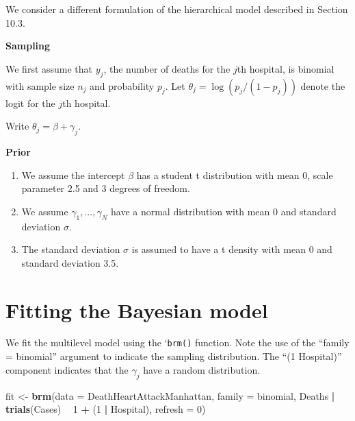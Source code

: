 \documentclass[
]{book}
\newenvironment{Shaded}{\begin{snugshade}}{\end{snugshade}}
\newcommand{\DataTypeTok}[1]{\textcolor[rgb]{0.13,0.29,0.53}{#1}}
\newcommand{\DecValTok}[1]{\textcolor[rgb]{0.00,0.00,0.81}{#1}}
\newcommand{\KeywordTok}[1]{\textcolor[rgb]{0.13,0.29,0.53}{\textbf{#1}}}
\newcommand{\NormalTok}[1]{#1}
\newcommand{\OperatorTok}[1]{\textcolor[rgb]{0.81,0.36,0.00}{\textbf{#1}}}
\newcommand{\StringTok}[1]{\textcolor[rgb]{0.31,0.60,0.02}{#1}}
\begin{document}
We consider a different formulation of the hierarchical model described in Section 10.3.

\textbf{Sampling}

We first assume that \(y_j\), the number of deaths for the \(j\)th hospital, is binomial with sample size \(n_j\) and probability \(p_j\). Let \(\theta_j = \log (p_j / (1 - p_j))\) denote the logit for the \(j\)th hospital.

Write \(\theta_j = \beta + \gamma_j\).

\textbf{Prior}

\begin{enumerate}
\def\labelenumi{\arabic{enumi}.}
\item
  We assume the intercept \(\beta\) has a student t distribution with mean 0, scale parameter 2.5 and 3 degrees of freedom.
\item
  We assume \(\gamma_1, ..., \gamma_N\) have a normal distribution with mean 0 and standard deviation \(\sigma\).
\item
  The standard deviation \(\sigma\) is assumed to have a t density with mean 0 and standard deviation 3.5.
\end{enumerate}

\hypertarget{fitting-the-bayesian-model}{%
\section{Fitting the Bayesian model}\label{fitting-the-bayesian-model}}

We fit the multilevel model using the `\texttt{brm()} function. Note the use of the ``family = binomial'' argument to indicate the sampling distribution. The ``(1 \textbar{} Hospital)'' component indicates that the \(\gamma_j\) have a random distribution.

\begin{Shaded}
\begin{Highlighting}[]
\NormalTok{fit <-}\StringTok{ }\KeywordTok{brm}\NormalTok{(}\DataTypeTok{data =}\NormalTok{ DeathHeartAttackManhattan, }
           \DataTypeTok{family =}\NormalTok{ binomial,}
\NormalTok{           Deaths }\OperatorTok{|}\StringTok{ }\KeywordTok{trials}\NormalTok{(Cases) }\OperatorTok{~}\StringTok{ }\DecValTok{1} \OperatorTok{+}\StringTok{ }\NormalTok{(}\DecValTok{1} \OperatorTok{|}\StringTok{ }\NormalTok{Hospital),}
           \DataTypeTok{refresh =} \DecValTok{0}\NormalTok{)}
\end{Highlighting}
\end{Shaded}
\end{document}
